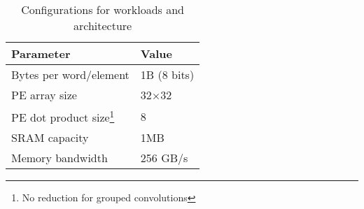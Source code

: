 \begin{scriptsize}
    \begin{table}[h!]
\begin{scriptsize}
    
  \begin{center}
  \caption{Configurations for workloads and architecture} 
  \label{table:config}
  \begin{centering}
  \begin{tabular}{|l|l|}
    \hline
    \textbf{Parameter} & \textbf{Value}  \\
    \hline
    Bytes per word/element & 1B (8 bits)\\\hline
    PE array size & 32$\times$32\\ 
    \hline
    PE dot product size\footnote{No reduction for grouped convolutions} & 8\\\hline
    SRAM capacity & 1MB \\\hline
   Memory bandwidth & 256 GB/s\\\hline
  \end{tabular}
\vspace{-3mm}
\end{centering}
\end{center}
\end{scriptsize}

\end{table}
\end{scriptsize}